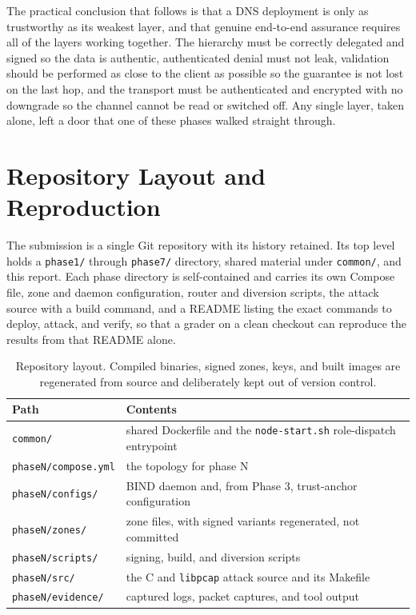 \documentclass[11pt]{article}
\begin{document}
The practical conclusion that follows is that a DNS deployment is only as
trustworthy as its weakest layer, and that genuine end-to-end assurance requires all
of the layers working together. The hierarchy must be correctly delegated and signed
so the data is authentic, authenticated denial must not leak, validation should be
performed as close to the client as possible so the guarantee is not lost on the
last hop, and the transport must be authenticated and encrypted with no downgrade so
the channel cannot be read or switched off. Any single layer, taken alone, left a
door that one of these phases walked straight through.

\clearpage

\appendix

\section{Repository Layout and Reproduction}

The submission is a single Git repository with its history retained. Its top level
holds a \texttt{phase1/} through \texttt{phase7/} directory, shared material under
\texttt{common/}, and this report. Each phase directory is self-contained and
carries its own Compose file, zone and daemon configuration, router and diversion
scripts, the attack source with a build command, and a README listing the exact
commands to deploy, attack, and verify, so that a grader on a clean checkout can
reproduce the results from that README alone.

\begin{table}[H]
\centering
\small
\begin{tabularx}{\linewidth}{l Y}
\toprule
\textbf{Path} & \textbf{Contents} \\
\midrule
\texttt{common/} & shared Dockerfile and the \texttt{node-start.sh} role-dispatch entrypoint \\
\texttt{phaseN/compose.yml} & the topology for phase N \\
\texttt{phaseN/configs/} & BIND daemon and, from Phase 3, trust-anchor configuration \\
\texttt{phaseN/zones/} & zone files, with signed variants regenerated, not committed \\
\texttt{phaseN/scripts/} & signing, build, and diversion scripts \\
\texttt{phaseN/src/} & the C and \texttt{libpcap} attack source and its Makefile \\
\texttt{phaseN/evidence/} & captured logs, packet captures, and tool output \\
\bottomrule
\end{tabularx}
\caption{Repository layout. Compiled binaries, signed zones, keys, and built images are regenerated from source and deliberately kept out of version control.}
\label{tab:repo}
\end{table}
\end{document}
